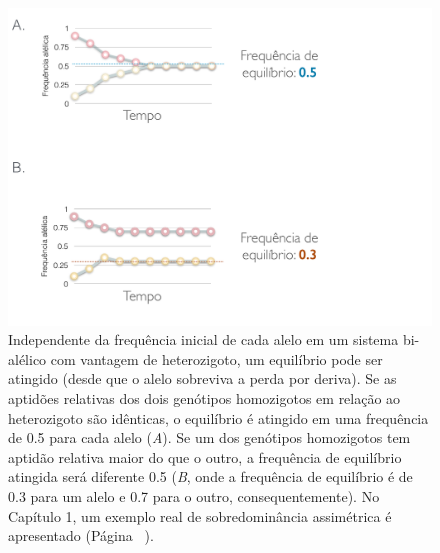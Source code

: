 \begin{refsection}
\begin{figure}[h]
\begin{center}
\includegraphics[width=12 cm,keepaspectratio]{chap1_folder/Figures/frequencia_equilibrio.pdf}
\caption{Independente da frequência inicial de cada alelo em um sistema bi-alélico com vantagem de heterozigoto, um equilíbrio pode ser atingido (desde que o alelo sobreviva a perda por deriva). Se as aptidões relativas dos dois genótipos homozigotos em relação ao heterozigoto são idênticas, o equilíbrio é atingido em uma frequência de 0.5 para cada alelo (\emph{A}). Se um dos genótipos homozigotos tem aptidão relativa maior do que o outro, a frequência de equilíbrio atingida será diferente 0.5 (\emph{B}, onde a frequência de equilíbrio é de 0.3 para um alelo e 0.7 para o outro, consequentemente). No Capítulo 1, um exemplo real de sobredominância assimétrica é apresentado (Página ~\pageref{page:HbS}).}
\label{fig:FrequenciaEquilibrio}
\end{center}
\end{figure}


\end{refsection}
